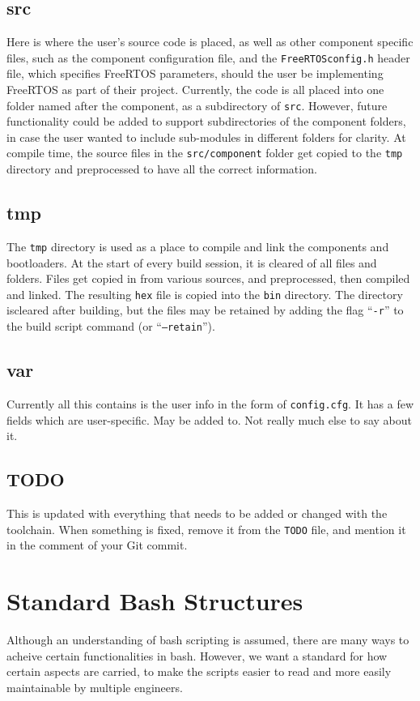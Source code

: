 \documentclass[a4paper, oneside, 11pt, titlepage, onecolumn, openright]{report}
\begin{document}
\section{src}
			\label{s:src}
			Here is where the user's source code is placed, as well as other component specific files, such as the component configuration file, and the \texttt{FreeRTOSconfig.h} header file, which specifies FreeRTOS parameters, should the user be implementing FreeRTOS as part of their project.
			Currently, the code is all placed into one folder named after the component, as a subdirectory of \texttt{src}. However, future functionality could be added to support subdirectories of the component folders, in case the user wanted to include sub-modules in different folders for clarity.
			At compile time, the source files in the \texttt{src/component} folder get copied to the \texttt{tmp} directory and preprocessed to have all the correct information.
			
\section{tmp}
			\label{s:tmp}
			The \texttt{tmp} directory is used as a place to compile and link the components and bootloaders. At the start of every build session, it is cleared of all files and folders. Files get copied in from various sources, and preprocessed, then compiled and linked. The resulting \texttt{hex} file is copied into the \texttt{bin} directory. 
			The directory iscleared after building, but the files may be retained by adding the flag ``\texttt{-r}'' to the build script command (or ``\texttt{--retain}'').
			
\section{var}
			\label{s:var}
			Currently all this contains is the user info in the form of \texttt{config.cfg}. It has a few fields which are user-specific. May be added to. Not really much else to say about it.
			
\section{TODO}
			\label{s:TODO}
			This is updated with everything that needs to be added or changed with the toolchain. When something is fixed, remove it from the \texttt{TODO} file, and mention it in the comment of your Git commit.
\pagebreak			
\chapter{Standard Bash Structures}
			\label{C:BashStructures}
			Although an understanding of bash scripting is assumed, there are many ways to acheive certain functionalities in bash. However, we want a standard for how certain aspects are carried, to make the scripts easier to read and more easily maintainable by multiple engineers.
			
\end{document}
